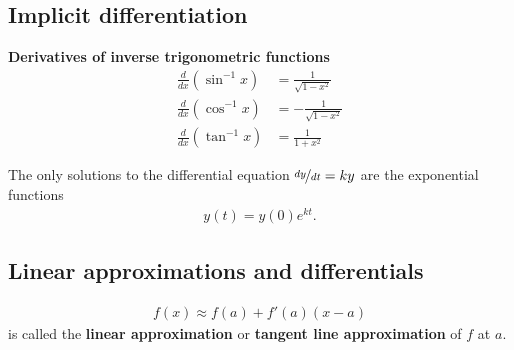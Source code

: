 \documentclass{article}
\begin{document}
\subsection{Implicit differentiation}
\begin{theorem}
    \textbf{Derivatives of inverse trigonometric functions}\\
    \begin{align*}
        \frac{d}{dx}(\sin^{-1}x) & =\frac{1}{\sqrt{1-x^2}}  \\
        \frac{d}{dx}(\cos^{-1}x) & =-\frac{1}{\sqrt{1-x^2}} \\
        \frac{d}{dx}(\tan^{-1}x) & =\frac{1}{1+x^2}
    \end{align*}
\end{theorem}
\begin{theorem}
    The only solutions to the differential equation $\nicefrac{dy}{dt}=ky$ are the exponential functions
    \begin{align*}
        y(t)=y(0)e^{kt}.
    \end{align*}
\end{theorem}
\setcounter{subsection}{9}
\subsection{Linear approximations and differentials}
\begin{theorem}
    \begin{align*}
        f(x)\approx f(a)+f'(a)(x-a)
    \end{align*}
    is called the \textbf{linear approximation} or \textbf{tangent line approximation} of $f$ at $a$.
\end{theorem}
\end{document}
